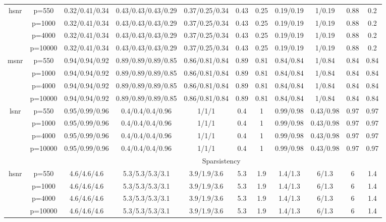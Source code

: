 \begin{table}[ht]
{\begin{tabular}{|c|c|ccccccccc|}
\midrule\multirow{4}[2]{*}{hsnr} & p=550 & 0.32/0.41/0.34 & 0.43/0.43/0.43/0.29 & 0.37/0.25/0.34 & 0.43 & 0.25 & 0.19/0.19 & 1/0.19 & 0.88 & 0.2 \\ 
   & p=1000 & 0.32/0.41/0.34 & 0.43/0.43/0.43/0.29 & 0.37/0.25/0.34 & 0.43 & 0.25 & 0.19/0.19 & 1/0.19 & 0.88 & 0.2 \\ 
   & p=4000 & 0.32/0.41/0.34 & 0.43/0.43/0.43/0.29 & 0.37/0.25/0.34 & 0.43 & 0.25 & 0.19/0.19 & 1/0.19 & 0.88 & 0.2 \\ 
   & p=10000 & 0.32/0.41/0.34 & 0.43/0.43/0.43/0.29 & 0.37/0.25/0.34 & 0.43 & 0.25 & 0.19/0.19 & 1/0.19 & 0.88 & 0.2 \\ 
  \midrule\multirow{4}[2]{*}{msnr} & p=550 & 0.94/0.94/0.92 & 0.89/0.89/0.89/0.85 & 0.86/0.81/0.84 & 0.89 & 0.81 & 0.84/0.84 & 1/0.84 & 0.84 & 0.84 \\ 
   & p=1000 & 0.94/0.94/0.92 & 0.89/0.89/0.89/0.85 & 0.86/0.81/0.84 & 0.89 & 0.81 & 0.84/0.84 & 1/0.84 & 0.84 & 0.84 \\ 
   & p=4000 & 0.94/0.94/0.92 & 0.89/0.89/0.89/0.85 & 0.86/0.81/0.84 & 0.89 & 0.81 & 0.84/0.84 & 1/0.84 & 0.84 & 0.84 \\ 
   & p=10000 & 0.94/0.94/0.92 & 0.89/0.89/0.89/0.85 & 0.86/0.81/0.84 & 0.89 & 0.81 & 0.84/0.84 & 1/0.84 & 0.84 & 0.84 \\ 
  \midrule\multirow{4}[2]{*}{lsnr} & p=550 & 0.95/0.99/0.96 & 0.4/0.4/0.4/0.96 & 1/1/1 & 0.4 & 1 & 0.99/0.98 & 0.43/0.98 & 0.97 & 0.97 \\ 
   & p=1000 & 0.95/0.99/0.96 & 0.4/0.4/0.4/0.96 & 1/1/1 & 0.4 & 1 & 0.99/0.98 & 0.43/0.98 & 0.97 & 0.97 \\ 
   & p=4000 & 0.95/0.99/0.96 & 0.4/0.4/0.4/0.96 & 1/1/1 & 0.4 & 1 & 0.99/0.98 & 0.43/0.98 & 0.97 & 0.97 \\ 
   & p=10000 & 0.95/0.99/0.96 & 0.4/0.4/0.4/0.96 & 1/1/1 & 0.4 & 1 & 0.99/0.98 & 0.43/0.98 & 0.97 & 0.97 \\ 
   \midrule 
 \multicolumn{1}{|c}{} &       & \multicolumn{9}{c|}{Sparsistency} \\
\midrule\multirow{4}[2]{*}{hsnr} & p=550 & 4.6/4.6/4.6 & 5.3/5.3/5.3/3.1 & 3.9/1.9/3.6 & 5.3 & 1.9 & 1.4/1.3 & 6/1.3 & 6 & 1.4 \\ 
   & p=1000 & 4.6/4.6/4.6 & 5.3/5.3/5.3/3.1 & 3.9/1.9/3.6 & 5.3 & 1.9 & 1.4/1.3 & 6/1.3 & 6 & 1.4 \\ 
   & p=4000 & 4.6/4.6/4.6 & 5.3/5.3/5.3/3.1 & 3.9/1.9/3.6 & 5.3 & 1.9 & 1.4/1.3 & 6/1.3 & 6 & 1.4 \\ 
   & p=10000 & 4.6/4.6/4.6 & 5.3/5.3/5.3/3.1 & 3.9/1.9/3.6 & 5.3 & 1.9 & 1.4/1.3 & 6/1.3 & 6 & 1.4 \\ 

\end{tabular}}
\end{table}
